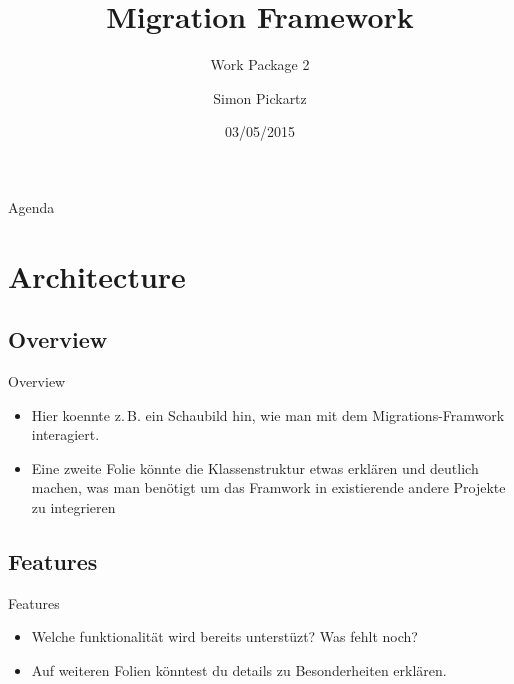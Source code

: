 \documentclass[10pt, aspectratio=1610]{beamer}
\title{Migration Framework}
\subtitle{Work Package 2}
\author{Simon Pickartz}
\institute[]{The \fast Project}
\date{03/05/2015}
\begin{document}

\begin{frame}{Agenda}
	\tableofcontents
\end{frame}

\section{Architecture}
\subsection{Overview}
\begin{frame}{Overview}
	\begin{itemize}
		\item Hier koennte z.\,B. ein Schaubild hin, wie man mit dem Migrations-Framwork interagiert.
		\item Eine zweite Folie könnte die Klassenstruktur etwas erklären und deutlich machen, was man benötigt um das Framwork in existierende andere Projekte zu integrieren
	\end{itemize}
\end{frame}

\subsection{Features}
\begin{frame}{Features}
	\begin{itemize}
		\item Welche funktionalität wird bereits unterstüzt? Was fehlt noch?
		\item Auf weiteren Folien könntest du details zu Besonderheiten erklären.
	\end{itemize}
\end{frame}
\end{document}

